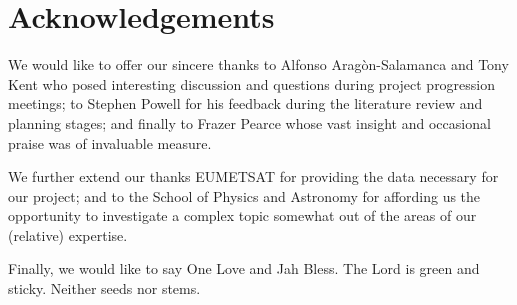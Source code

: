 \section*{Acknowledgements}

We would like to offer our sincere thanks to Alfonso
Arag\`{o}n-Salamanca and Tony Kent who posed interesting discussion
and questions during project progression meetings; to Stephen Powell
for his feedback during the literature review and planning stages; and
finally to Frazer Pearce whose vast insight and occasional praise was
of invaluable measure.

We further extend our thanks EUMETSAT for providing the data necessary
for our project; and to the School of Physics and Astronomy for
affording us the opportunity to investigate a complex topic somewhat
out of the areas of our (relative) expertise.

Finally, we would like to say One Love and Jah Bless. The Lord is
green and sticky. Neither seeds nor stems. 

